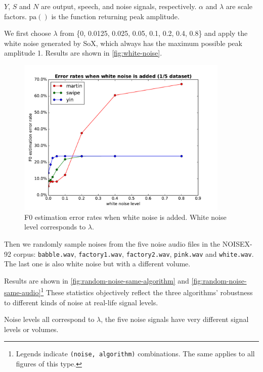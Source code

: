 \documentclass[11pt,a4paper]{report}
\begin{document}
\(Y\), \(S\) and \(N\) are output, speech, and noise signals, respectively.
\(\alpha\) and \(\lambda\) are scale factors.
\(\mathrm{pa}()\) is the function returning peak amplitude.

We first choose \(\lambda\) from \{0, 0.0125, 0.025, 0.05, 0.1, 0.2, 0.4, 0.8\} and apply the white noise generated by SoX, which always has the maximum possible peak amplitude 1.
Results are shown in \autoref{fig:white-noise}.

\begin{figure}[htbp]
  \centering
  \includegraphics[width=0.9\textwidth]{error_rates_white_noise_added.pdf}
  \caption[F0 estimation error rates when white noise is added.]{F0 estimation error rates when white noise is added.
    White noise level corresponds to \(\lambda\).}
  \label{fig:white-noise}
\end{figure}

Then we randomly sample noises from the five noise audio files in the NOISEX-92 corpus: \texttt{babble.wav}, \texttt{factory1.wav}, \texttt{factory2.wav}, \texttt{pink.wav} and \texttt{white.wav}.
The last one is also white noise but with a different volume.

Results are shown in \autoref{fig:random-noise-same-algorithm} and \autoref{fig:random-noise-same-audio}\footnote{Legends indicate \texttt{(noise, algorithm)} combinations.
The same applies to all figures of this type.} These statistics objectively reflect the three algorithms' robustness to different kinds of noise at real-life signal levels.

Noise levels all correspond to \(\lambda\), the five noise signals have very different signal levels or volumes.
\end{document}
